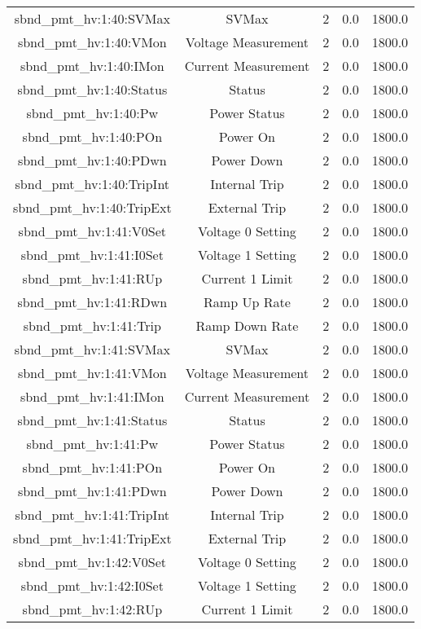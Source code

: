 \begin{table}[ptb]
\begin{tabular}{c | c c c c}
sbnd_pmt_hv:1:40:SVMax & SVMax & 2 & 0.0 & 1800.0\\ 
sbnd_pmt_hv:1:40:VMon & Voltage Measurement & 2 & 0.0 & 1800.0\\ 
sbnd_pmt_hv:1:40:IMon & Current Measurement & 2 & 0.0 & 1800.0\\ 
sbnd_pmt_hv:1:40:Status & Status & 2 & 0.0 & 1800.0\\ 
sbnd_pmt_hv:1:40:Pw & Power Status & 2 & 0.0 & 1800.0\\ 
sbnd_pmt_hv:1:40:POn & Power On & 2 & 0.0 & 1800.0\\ 
sbnd_pmt_hv:1:40:PDwn & Power Down & 2 & 0.0 & 1800.0\\ 
sbnd_pmt_hv:1:40:TripInt & Internal Trip & 2 & 0.0 & 1800.0\\ 
sbnd_pmt_hv:1:40:TripExt & External Trip & 2 & 0.0 & 1800.0\\ 
sbnd_pmt_hv:1:41:V0Set & Voltage 0 Setting & 2 & 0.0 & 1800.0\\ 
sbnd_pmt_hv:1:41:I0Set & Voltage 1 Setting & 2 & 0.0 & 1800.0\\ 
sbnd_pmt_hv:1:41:RUp & Current 1 Limit & 2 & 0.0 & 1800.0\\ 
sbnd_pmt_hv:1:41:RDwn & Ramp Up Rate & 2 & 0.0 & 1800.0\\ 
sbnd_pmt_hv:1:41:Trip & Ramp Down Rate & 2 & 0.0 & 1800.0\\ 
sbnd_pmt_hv:1:41:SVMax & SVMax & 2 & 0.0 & 1800.0\\ 
sbnd_pmt_hv:1:41:VMon & Voltage Measurement & 2 & 0.0 & 1800.0\\ 
sbnd_pmt_hv:1:41:IMon & Current Measurement & 2 & 0.0 & 1800.0\\ 
sbnd_pmt_hv:1:41:Status & Status & 2 & 0.0 & 1800.0\\ 
sbnd_pmt_hv:1:41:Pw & Power Status & 2 & 0.0 & 1800.0\\ 
sbnd_pmt_hv:1:41:POn & Power On & 2 & 0.0 & 1800.0\\ 
sbnd_pmt_hv:1:41:PDwn & Power Down & 2 & 0.0 & 1800.0\\ 
sbnd_pmt_hv:1:41:TripInt & Internal Trip & 2 & 0.0 & 1800.0\\ 
sbnd_pmt_hv:1:41:TripExt & External Trip & 2 & 0.0 & 1800.0\\ 
sbnd_pmt_hv:1:42:V0Set & Voltage 0 Setting & 2 & 0.0 & 1800.0\\ 
sbnd_pmt_hv:1:42:I0Set & Voltage 1 Setting & 2 & 0.0 & 1800.0\\ 
sbnd_pmt_hv:1:42:RUp & Current 1 Limit & 2 & 0.0 & 1800.0\\ 

\end{tabular}
\end{table}
